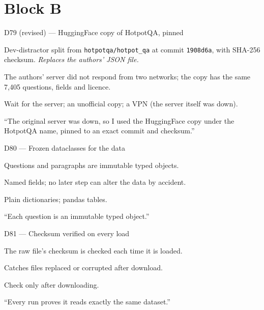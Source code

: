 \documentclass[11pt,a4paper]{report}
\begin{document}
\section{Block B}\label{sec:decisions-b}

\begin{decisionbox}{D79 (revised) --- HuggingFace copy of HotpotQA, pinned}
\begin{description}[nosep, leftmargin=0pt]
  \item[Decision.] Dev-distractor split from \texttt{hotpotqa/hotpot\_qa} at commit \texttt{1908d6a}, with SHA-256 checksum. \emph{Replaces the authors' JSON file.}
  \item[Why.] The authors' server did not respond from two networks; the copy has the same 7{,}405 questions, fields and licence.
  \item[Alternatives.] Wait for the server; an unofficial copy; a VPN (the server itself was down).
  \item[Interview line.] ``The original server was down, so I used the HuggingFace copy under the HotpotQA name, pinned to an exact commit and checksum.''
\end{description}
\end{decisionbox}

\begin{decisionbox}{D80 --- Frozen dataclasses for the data}
\begin{description}[nosep, leftmargin=0pt]
  \item[Decision.] Questions and paragraphs are immutable typed objects.
  \item[Why.] Named fields; no later step can alter the data by accident.
  \item[Alternatives.] Plain dictionaries; pandas tables.
  \item[Interview line.] ``Each question is an immutable typed object.''
\end{description}
\end{decisionbox}

\begin{decisionbox}{D81 --- Checksum verified on every load}
\begin{description}[nosep, leftmargin=0pt]
  \item[Decision.] The raw file's checksum is checked each time it is loaded.
  \item[Why.] Catches files replaced or corrupted after download.
  \item[Alternatives.] Check only after downloading.
  \item[Interview line.] ``Every run proves it reads exactly the same dataset.''
\end{description}
\end{decisionbox}
\end{document}
